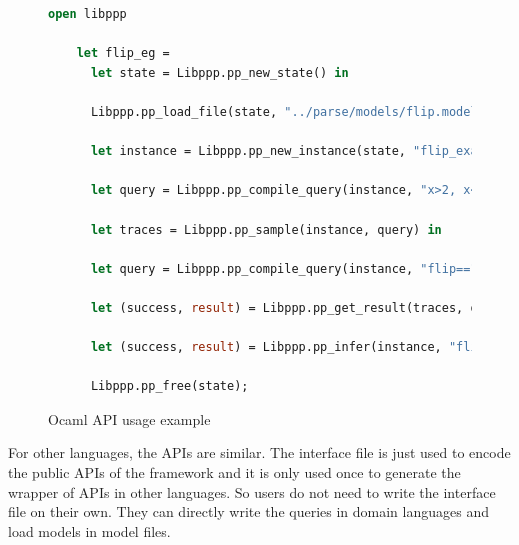 \begin{figure}
  \begin{lstlisting}[language=Caml]
    open libppp

    let flip_eg =
      let state = Libppp.pp_new_state() in

      Libppp.pp_load_file(state, "../parse/models/flip.model")

      let instance = Libppp.pp_new_instance(state, "flip_example", None) in

      let query = Libppp.pp_compile_query(instance, "x>2, x<3") in

      let traces = Libppp.pp_sample(instance, query) in

      let query = Libppp.pp_compile_query(instance, "flip==1") in

      let (success, result) = Libppp.pp_get_result(traces, query) in

      let (success, result) = Libppp.pp_infer(instance, "flip == 1", "x > 2, x < 3") in

      Libppp.pp_free(state);
  \end{lstlisting}
  \caption{Ocaml API usage example}
  \label{fig:ocaml}
\end{figure}

For other languages, the APIs are similar. The interface file is just used to encode the public APIs of the framework and it is only used once to generate the wrapper of APIs in other languages. So users do not need to write the interface file on their own. They can directly write the queries in domain languages and load models in model files.
